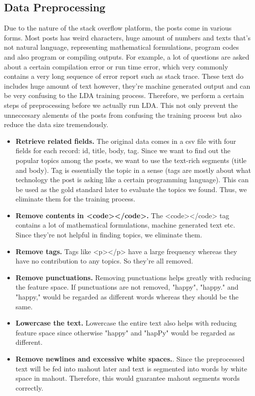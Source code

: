 \documentclass[conference]{IEEEtran}
\begin{document}
\subsection{Data Preprocessing}
Due to the nature of the stack overflow platform, the posts come in various forms. Most posts has weird characters, huge amount of numbers and texts that's not natural language, representing mathematical formulations, program codes and also program or compiling outputs. For example, a lot of questions are asked about a certain compilation error or run time error, which very commonly contains a very long sequence of error report such as stack trace. These text do includes huge amount of text however, they're machine generated output and can be very confusing to the LDA training process. Therefore, we perform a certain steps of preprocessing before we actually run LDA. This not only prevent the unneccesary alements of the posts from confusing the training process but also reduce the data size tremendously.

\begin{itemize}
	\item \textbf{Retrieve related fields.} The original data comes in a csv file with four fields for each record: id, title, body, tag. Since we want to find out the popular topics among the posts, we want to use the text-rich segments (title and body). Tag is essentially the topic in a sense (tags are mostly about what technology the post is asking like a certain programming language). This can be used as the gold standard later to evaluate the topics we found. Thus, we eliminate them for the training process. 
	\item \textbf{Remove contents in <code></code>.} The <code></code> tag contains a lot of mathematical formulations, machine generated text etc. Since they're not helpful in finding topics, we eliminate them.
	\item \textbf{Remove tags.} Tags like <p></p> have a large frequency whereas they have no contribution to any topics. So they're all removed.
	\item \textbf{Remove punctuations.} Removing punctuations helps greatly with reducing the feature space. If punctuations are not removed, "happy", "happy." and "happy," would be regarded as different words whereas they should be the same.
	\item \textbf{Lowercase the text.} Lowercase the entire text also helps with reducing feature space since otherwise "happy" and "hapPy" would be regarded as different.
	\item \textbf{Remove newlines and excessive white spaces.}. Since the preprocessed text will be fed into mahout later and text is segmented into words by white space in mahout. Therefore, this would guarantee mahout segments words correctly.
\end{itemize}
\end{document}
